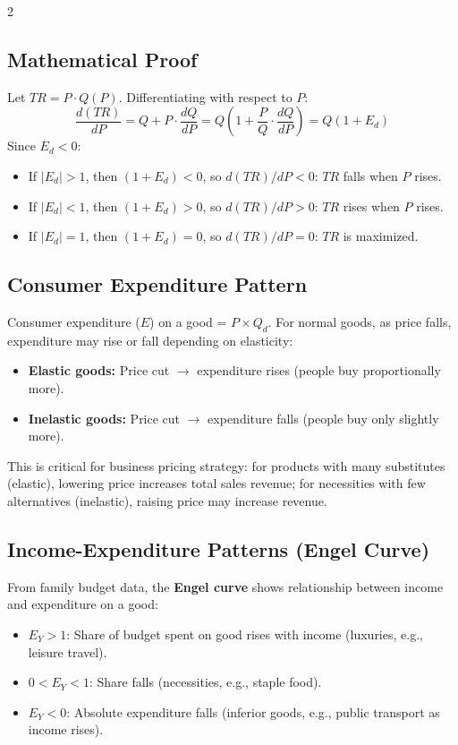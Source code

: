 \documentclass[10pt,a4paper]{article}
\begin{document}
\begin{multicols}{2}
\subsection*{Mathematical Proof}
Let $TR = P \cdot Q(P)$. Differentiating with respect to $P$:
\[
\frac{d(TR)}{dP} = Q + P \cdot \frac{dQ}{dP} = Q \left(1 + \frac{P}{Q} \cdot \frac{dQ}{dP}\right) = Q (1 + E_d)
\]
Since $E_d < 0$:
\begin{itemize}[leftmargin=*,nosep]
    \item If $|E_d| > 1$, then $(1+E_d) < 0$, so $d(TR)/dP < 0$: $TR$ falls when $P$ rises.
    \item If $|E_d| < 1$, then $(1+E_d) > 0$, so $d(TR)/dP > 0$: $TR$ rises when $P$ rises.
    \item If $|E_d| = 1$, then $(1+E_d) = 0$, so $d(TR)/dP = 0$: $TR$ is maximized.
\end{itemize}

\subsection*{Consumer Expenditure Pattern}
Consumer expenditure ($E$) on a good = $P \times Q_d$. For normal goods, as price falls, expenditure may rise or fall depending on elasticity:
\begin{itemize}[leftmargin=*,nosep]
    \item \textbf{Elastic goods:} Price cut $\to$ expenditure rises (people buy proportionally more).
    \item \textbf{Inelastic goods:} Price cut $\to$ expenditure falls (people buy only slightly more).
\end{itemize}
This is critical for business pricing strategy: for products with many substitutes (elastic), lowering price increases total sales revenue; for necessities with few alternatives (inelastic), raising price may increase revenue.

\subsection*{Income-Expenditure Patterns (Engel Curve)}
From family budget data, the \textbf{Engel curve} shows relationship between income and expenditure on a good:
\begin{itemize}[leftmargin=*,nosep]
    \item $E_Y > 1$: Share of budget spent on good rises with income (luxuries, e.g., leisure travel).
    \item $0 < E_Y < 1$: Share falls (necessities, e.g., staple food).
    \item $E_Y < 0$: Absolute expenditure falls (inferior goods, e.g., public transport as income rises).
\end{itemize}


\end{multicols}
\end{document}
